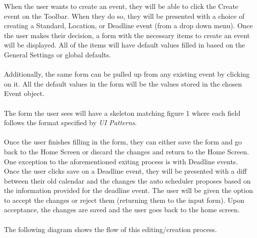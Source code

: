 \documentclass{scrreprt}
\begin{document}
When the user wants to create an event, they will be able to click the Create event on the Toolbar.  When they do so, they will be presented with a choice of creating a Standard, Location, or Deadline event (from a drop down menu). Once the user makes their decision, a form with the necessary items to create an event will be displayed.  All of the items will have default values filled in based on the General Settings or global defaults.
\\\\
Additionally, the same form can be pulled up from any existing event by clicking on  it.  All the default values in the form will be the values stored in the chosen Event object.
\\\\
The form the user sees will have a skeleton matching figure 1 where each field follows the format specified by \textit{UI Patterns}.
\\\\
Once the user finishes filling in the form, they can either save the form and go back to the Home Screen or discard the changes and return to the Home Screen.
\\
One exception to the aforementioned exiting process is with Deadline events.  Once the user clicks save on a Deadline event, they will be presented with a diff between their old calendar and the changes the auto scheduler proposes based on the information provided for the deadline event.  The user will be given the option to accept the changes or reject them (returning them to the input form).  Upon acceptance, the changes are saved and the user goes back to the home screen.
\\\\
The following diagram shows the flow of this editing/creation process.
\\\\
\end{document}
